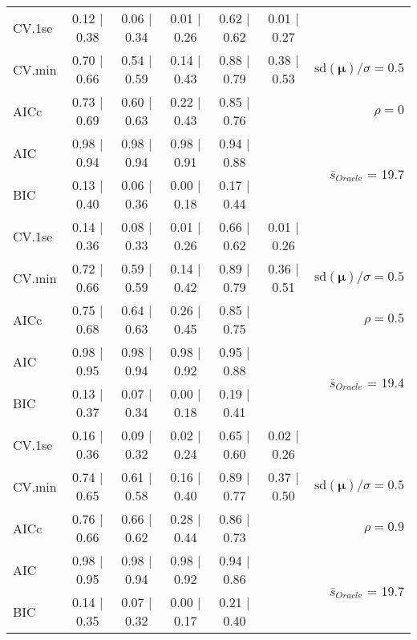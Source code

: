 \begin{table}
\begin{center}
\begin{tabular}{l*{5}{c}|r}
 \hline 
CV.1se & 0.12 $\mid$ 0.38 & 0.06 $\mid$ 0.34 & 0.01 $\mid$ 0.26 & 0.62 $\mid$ 0.62 & 0.01 $\mid$ 0.27 & \\
CV.min & 0.70 $\mid$ 0.66 & 0.54 $\mid$ 0.59 & 0.14 $\mid$ 0.43 & 0.88 $\mid$ 0.79 & 0.38 $\mid$ 0.53 &  $\mathrm{sd}(\mathbf{\mu})/\sigma=0.5$ \\
AICc & 0.73 $\mid$ 0.69 & 0.60 $\mid$ 0.63 & 0.22 $\mid$ 0.43 & 0.85 $\mid$ 0.76 & & $\rho=0$ \\
AIC & 0.98 $\mid$ 0.94 & 0.98 $\mid$ 0.94 & 0.98 $\mid$ 0.91 & 0.94 $\mid$ 0.88 & &  \multirow{2}{*}{$\bar{s}_{Oracle}$ = 19.7} \\
BIC & 0.13 $\mid$ 0.40 & 0.06 $\mid$ 0.36 & 0.00 $\mid$ 0.18 & 0.17 $\mid$ 0.44 & &  \\
 \hline 
CV.1se & 0.14 $\mid$ 0.36 & 0.08 $\mid$ 0.33 & 0.01 $\mid$ 0.26 & 0.66 $\mid$ 0.62 & 0.01 $\mid$ 0.26 & \\
CV.min & 0.72 $\mid$ 0.66 & 0.59 $\mid$ 0.59 & 0.14 $\mid$ 0.42 & 0.89 $\mid$ 0.79 & 0.36 $\mid$ 0.51 &  $\mathrm{sd}(\mathbf{\mu})/\sigma=0.5$ \\
AICc & 0.75 $\mid$ 0.68 & 0.64 $\mid$ 0.63 & 0.26 $\mid$ 0.45 & 0.85 $\mid$ 0.75 & & $\rho=0.5$ \\
AIC & 0.98 $\mid$ 0.95 & 0.98 $\mid$ 0.94 & 0.98 $\mid$ 0.92 & 0.95 $\mid$ 0.88 & &  \multirow{2}{*}{$\bar{s}_{Oracle}$ = 19.4} \\
BIC & 0.13 $\mid$ 0.37 & 0.07 $\mid$ 0.34 & 0.00 $\mid$ 0.18 & 0.19 $\mid$ 0.41 & &  \\
 \hline 
CV.1se & 0.16 $\mid$ 0.36 & 0.09 $\mid$ 0.32 & 0.02 $\mid$ 0.24 & 0.65 $\mid$ 0.60 & 0.02 $\mid$ 0.26 & \\
CV.min & 0.74 $\mid$ 0.65 & 0.61 $\mid$ 0.58 & 0.16 $\mid$ 0.40 & 0.89 $\mid$ 0.77 & 0.37 $\mid$ 0.50 &  $\mathrm{sd}(\mathbf{\mu})/\sigma=0.5$ \\
AICc & 0.76 $\mid$ 0.66 & 0.66 $\mid$ 0.62 & 0.28 $\mid$ 0.44 & 0.86 $\mid$ 0.73 & & $\rho=0.9$ \\
AIC & 0.98 $\mid$ 0.95 & 0.98 $\mid$ 0.94 & 0.98 $\mid$ 0.92 & 0.94 $\mid$ 0.86 & &  \multirow{2}{*}{$\bar{s}_{Oracle}$ = 19.7} \\
BIC & 0.14 $\mid$ 0.35 & 0.07 $\mid$ 0.32 & 0.00 $\mid$ 0.17 & 0.21 $\mid$ 0.40 & &  \\
 \hline 
\end{tabular}
\end{center}
\vspace{-1cm}
\end{table}




